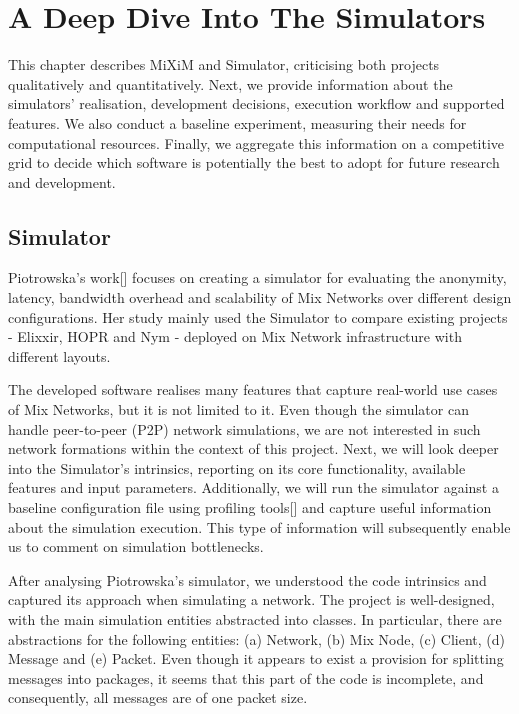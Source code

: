 \documentclass[logo,msc,cyber]{infthesis}   %
\begin{document}
\chapter{A Deep Dive Into The Simulators}

This chapter describes MiXiM and Simulator, criticising both projects
qualitatively and quantitatively. Next, we provide information about the
simulators' realisation, development decisions, execution workflow and supported
features. We also conduct a baseline experiment, measuring their needs for
computational resources. Finally, we aggregate this information on a competitive
grid to decide which software is potentially the best to adopt for future
research and development. 

\section{Simulator}
Piotrowska's work[] focuses on creating a simulator for evaluating the
anonymity, latency, bandwidth overhead and scalability of Mix Networks over
different design configurations. Her study mainly used the Simulator to compare
existing projects - Elixxir, HOPR and Nym - deployed on Mix Network
infrastructure with different layouts.

The developed software realises many features that capture real-world use cases
of Mix Networks, but it is not limited to it. Even though the simulator can
handle peer-to-peer (P2P) network simulations, we are not interested in such
network formations within the context of this project. Next, we will look deeper
into the Simulator's intrinsics, reporting on its core functionality, available
features and input parameters. Additionally, we will run the simulator against a
baseline configuration file using profiling tools[] and capture useful
information about the simulation execution. This type of information will
subsequently enable us to comment on simulation bottlenecks.

After analysing Piotrowska's simulator, we understood the code intrinsics and
captured its approach when simulating a network. The project is well-designed,
with the main simulation entities abstracted into classes. In particular, there
are abstractions for the following entities: (a) Network, (b) Mix Node, (c) Client,
(d) Message and (e) Packet. Even though it appears to exist a provision for
splitting messages into packages, it seems that this part of the code is
incomplete, and consequently, all messages are of one packet size.
\end{document}
